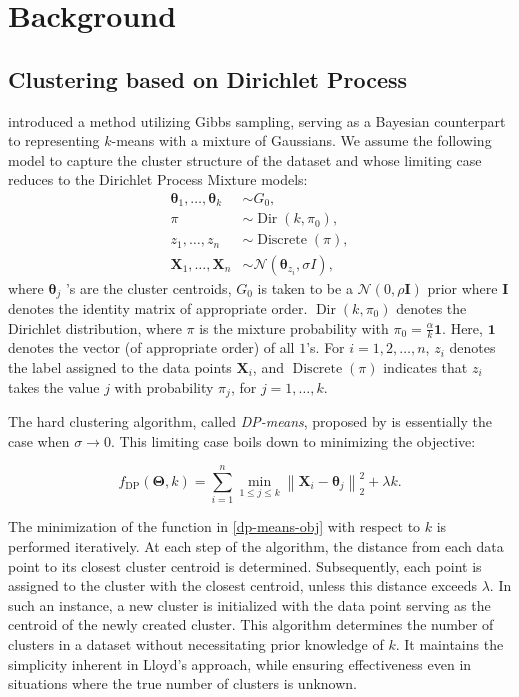 \documentclass[11pt]{article}
\newcommand{\bX}{\boldsymbol{X}}
\newcommand{\bTheta}{\boldsymbol{\Theta}}
\begin{document}
\section{Background}
\label{gen_inst}

\subsection{Clustering based on Dirichlet Process}

\cite{DP-Means} introduced a method utilizing Gibbs sampling, serving as a Bayesian counterpart to representing $k$-means with a mixture of Gaussians. We assume the following model to capture the cluster structure of the dataset and whose limiting case reduces to the Dirichlet Process Mixture models:
\begin{align*}
\boldsymbol{\theta}_1, \ldots, \boldsymbol{\theta}_{{k}} & \sim {G}_0, \\
\pi & \sim \operatorname{Dir}\left({k}, \pi_0\right), \\
{z}_1, \ldots, {z}_{{n}} & \sim \operatorname{Discrete}(\pi), \\
{\bX}_1, \ldots, {\bX}_{{n}} & \sim \mathcal{N}\left(\boldsymbol{\theta}_{{z}_{{i}}}, \sigma I\right),
\end{align*}
where $\boldsymbol{\theta}_{{j}}$ 's are the cluster centroids, ${G}_0$ is taken to be a $\mathcal{N}(0, \rho \mathbf{I})$ prior where $\mathbf{I}$ denotes the identity matrix of appropriate order. $\operatorname{Dir}\left({k}, \pi_0\right)$ denotes the Dirichlet distribution, where $\pi$ is the mixture probability with $\pi_0=\frac{\alpha}{k} \mathbf{1}$. Here, $\mathbf{1}$  denotes the vector (of appropriate order) of all $1$'s. For $i = 1,2,\ldots,n$, ${z}_{{i}}$ denotes the label assigned to the data points ${\bX}_{{i}}$, and  $\operatorname{Discrete}(\pi)$ indicates that ${z}_{{i}}$ takes the value $j$ with probability $\pi_{{j}}$, for ${j}=1, \ldots, {k}$.

The hard clustering algorithm, called \textit{DP-means}, proposed by \cite{DP-Means} is essentially the case when $\sigma \to 0$. This limiting case boils down to minimizing the objective:

\begin{equation}\label{dp-means-obj}
    f_{\operatorname{DP}} (\bTheta, k)=\sum_{i=1}^n \min _{1 \leq j \leq k}\left\|{\bX}_i-\boldsymbol{\theta}_j\right\|_2^2+\lambda k.
\end{equation}

The minimization of the function in \eqref{dp-means-obj} with respect to $k$ is performed iteratively. At each step of the algorithm, the distance from each data point to its closest cluster centroid is determined. Subsequently, each point is assigned to the cluster with the closest centroid, unless this distance exceeds $\lambda$. In such an instance, a new cluster is initialized with the data point serving as the centroid of the newly created cluster. This algorithm determines the number of clusters in a dataset without necessitating prior knowledge of $k$. It maintains the simplicity inherent in Lloyd's approach, while ensuring effectiveness even in situations where the true number of clusters is unknown.
\end{document}

